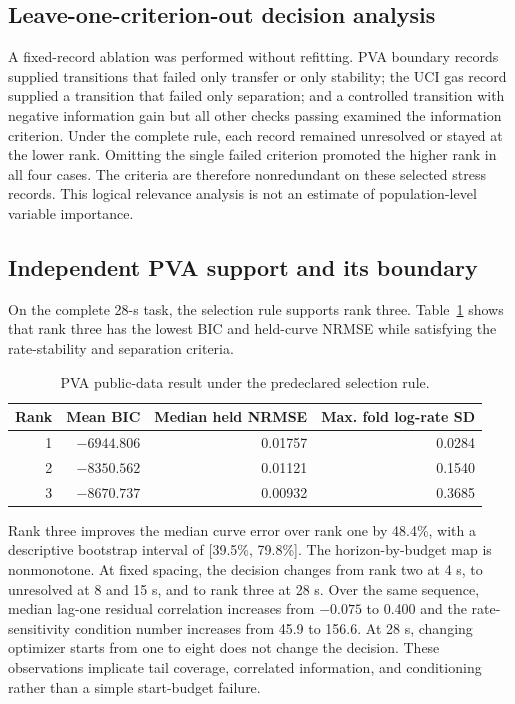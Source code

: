 \documentclass[11pt]{article}
\begin{document}
\subsection{Leave-one-criterion-out decision analysis}
A fixed-record ablation was performed without refitting. PVA boundary records supplied transitions that failed only transfer or only stability; the UCI gas record supplied a transition that failed only separation; and a controlled transition with negative information gain but all other checks passing examined the information criterion. Under the complete rule, each record remained unresolved or stayed at the lower rank. Omitting the single failed criterion promoted the higher rank in all four cases. The criteria are therefore nonredundant on these selected stress records. This logical relevance analysis is not an estimate of population-level variable importance.
\subsection{Independent PVA support and its boundary}
On the complete 28-s task, the selection rule supports rank three. Table~\ref{tab:pva} shows that rank three has the lowest BIC and held-curve NRMSE while satisfying the rate-stability and separation criteria.

\begin{table}[H]
\centering
\caption{PVA public-data result under the predeclared selection rule.}
\label{tab:pva}
\begin{tabular}{rrrr}
\toprule
Rank & Mean BIC & Median held NRMSE & Max. fold log-rate SD\\
\midrule
1 & $-6944.806$ & 0.01757 & 0.0284\\
2 & $-8350.562$ & 0.01121 & 0.1540\\
3 & $-8670.737$ & 0.00932 & 0.3685\\
\bottomrule
\end{tabular}
\end{table}

Rank three improves the median curve error over rank one by 48.4\%, with a descriptive bootstrap interval of [39.5\%, 79.8\%]. The horizon-by-budget map is nonmonotone. At fixed spacing, the decision changes from rank two at 4 s, to unresolved at 8 and 15 s, and to rank three at 28 s. Over the same sequence, median lag-one residual correlation increases from $-0.075$ to 0.400 and the rate-sensitivity condition number increases from 45.9 to 156.6. At 28 s, changing optimizer starts from one to eight does not change the decision. These observations implicate tail coverage, correlated information, and conditioning rather than a simple start-budget failure.
\end{document}
